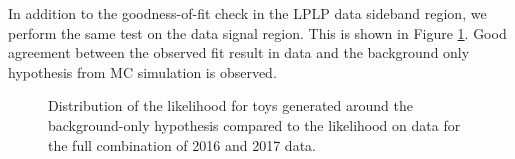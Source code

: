 In addition to the goodness-of-fit check in the LPLP data sideband region, we perform the same test on the data signal region. This is shown in Figure \ref{fig:gofSR}. Good agreement between the observed fit result in data and the background only hypothesis from MC simulation is observed.
\begin{figure}[h!]
\centering
{}
\caption{Distribution of the likelihood for toys generated around the background-only hypothesis compared to the likelihood on data for the full combination of 2016 and 2017 data.}
\label{fig:gofSR}
\end{figure}

